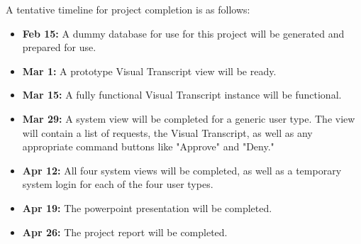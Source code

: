 A tentative timeline for project completion is as follows:

\begin{itemize} 
	\item{\textbf{Feb 15:} A dummy database for use for this project will be generated and prepared for use.} 
	
	\item{\textbf{Mar 1:} A prototype Visual Transcript view will be ready.}
	
	\item{\textbf{Mar 15:} A fully functional Visual Transcript instance will be functional.}
	
	\item{\textbf{Mar 29:} A system view will be completed for a generic user type. The view will contain a list of requests, the Visual Transcript, as well as any appropriate command buttons like "Approve" and "Deny."}
	
	\item{\textbf{Apr 12:} All four system views will be completed, as well as a temporary system login for each of the four user types.}
	
	\item{\textbf{Apr 19:} The powerpoint presentation will be completed.}
	
	\item{\textbf{Apr 26:} The project report will be completed.}
	
\end{itemize}
